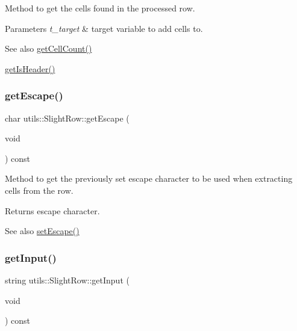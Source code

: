 Method to get the cells found in the processed row. 
\begin{DoxyParams}{Parameters}
{\em t\+\_\+target} & target variable to add cells to. \\
\hline
\end{DoxyParams}
\begin{DoxySeeAlso}{See also}
\hyperlink{classutils_1_1SlightRow_af7df52464ce8151d7c3c429d0a796c7f}{get\+Cell\+Count()} 

\hyperlink{classutils_1_1SlightRow_a702f97c32ea40303cd83a540404a6eca}{get\+Is\+Header()} 
\end{DoxySeeAlso}
\mbox{\label{classutils_1_1SlightRow_a75266f8f076b39135677cf54dcff986c}} 
\subsubsection{\texorpdfstring{get\+Escape()}{getEscape()}}
{\footnotesize\ttfamily char utils\+::\+Slight\+Row\+::get\+Escape (\begin{DoxyParamCaption}\item[{void}]{ }\end{DoxyParamCaption}) const}

Method to get the previously set escape character to be used when extracting cells from the row. \begin{DoxyReturn}{Returns}
escape character. 
\end{DoxyReturn}
\begin{DoxySeeAlso}{See also}
\hyperlink{classutils_1_1SlightRow_abdee6f0ba2d0e6ce32cc8e21020f2218}{set\+Escape()} 
\end{DoxySeeAlso}
\mbox{\label{classutils_1_1SlightRow_a8491ac21fba9e5c258e7c1a3bf3da26a}} 
\subsubsection{\texorpdfstring{get\+Input()}{getInput()}}
{\footnotesize\ttfamily string utils\+::\+Slight\+Row\+::get\+Input (\begin{DoxyParamCaption}\item[{void}]{ }\end{DoxyParamCaption}) const}

